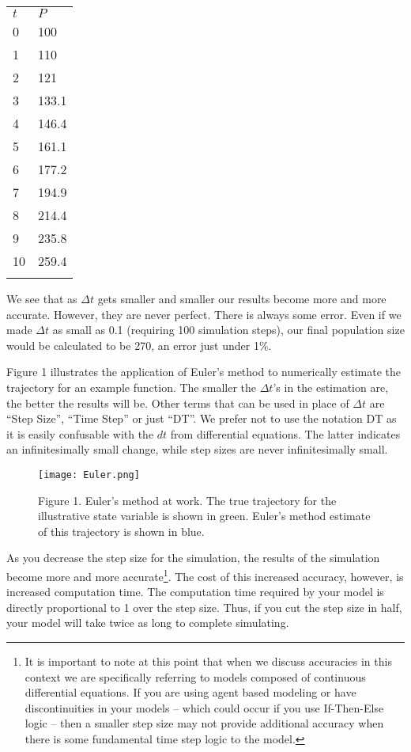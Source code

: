 \documentclass[]{memoir}
\let\Oldincludegraphics\includegraphics
\renewcommand{\includegraphics}[1]{\Oldincludegraphics[max size={\textwidth}{\textheight}]{#1}}
\begin{document}
\begin{longtable}[c]{@{}ll@{}}
\hline\noalign{\medskip}
$t$ & $P$
\\\noalign{\medskip}
\hline\noalign{\medskip}
0 & 100
\\\noalign{\medskip}
1 & 110
\\\noalign{\medskip}
2 & 121
\\\noalign{\medskip}
3 & 133.1
\\\noalign{\medskip}
4 & 146.4
\\\noalign{\medskip}
5 & 161.1
\\\noalign{\medskip}
6 & 177.2
\\\noalign{\medskip}
7 & 194.9
\\\noalign{\medskip}
8 & 214.4
\\\noalign{\medskip}
9 & 235.8
\\\noalign{\medskip}
10 & 259.4
\\\noalign{\medskip}
\hline
\end{longtable}

We see that as $\Delta t$ gets smaller and smaller our results become
more and more accurate. However, they are never perfect. There is always
some error. Even if we made $\Delta t$ as small as 0.1 (requiring 100
simulation steps), our final population size would be calculated to be
270, an error just under 1\%.

Figure 1 illustrates the application of Euler's method to numerically
estimate the trajectory for an example function. The smaller the
$\Delta t$'s in the estimation are, the better the results will be.
Other terms that can be used in place of $\Delta t$ are ``Step Size'',
``Time Step'' or just ``DT''. We prefer not to use the notation DT as it
is easily confusable with the $dt$ from differential equations. The
latter indicates an infinitesimally small change, while step sizes are
never infinitesimally small.

\begin{figure}[htbp]
\centering
\texttt{[image: Euler.png]}
\caption{Figure 1. Euler's method at work. The true trajectory for the
illustrative state variable is shown in green. Euler's method estimate
of this trajectory is shown in blue.}
\end{figure}

As you decrease the step size for the simulation, the results of the
simulation become more and more accurate\footnote{It is important to
  note at this point that when we discuss accuracies in this context we
  are specifically referring to models composed of continuous
  differential equations. If you are using agent based modeling or have
  discontinuities in your models -- which could occur if you use
  If-Then-Else logic -- then a smaller step size may not provide
  additional accuracy when there is some fundamental time step logic to
  the model.}. The cost of this increased accuracy, however, is
increased computation time. The computation time required by your model
is directly proportional to 1 over the step size. Thus, if you cut the
step size in half, your model will take twice as long to complete
simulating.
\end{document}
